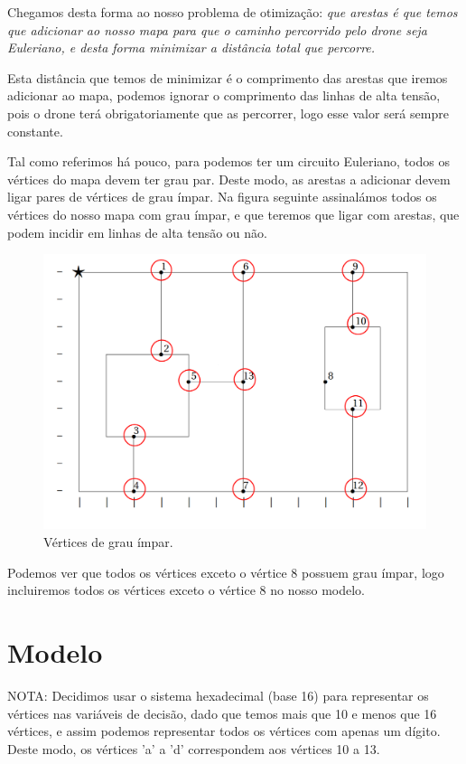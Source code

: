 \documentclass{article}
\begin{document}
Chegamos desta forma ao nosso problema de otimização: \emph{que arestas é que temos que adicionar ao nosso mapa para que o caminho percorrido pelo drone seja Euleriano, e desta forma minimizar a distância total que percorre.}

Esta distância que temos de minimizar é o comprimento das arestas que iremos adicionar ao mapa, podemos ignorar o comprimento das linhas de alta tensão, pois o drone terá obrigatoriamente que as percorrer, logo esse valor será sempre constante.

Tal como referimos há pouco, para podemos ter um circuito Euleriano, todos os vértices do mapa devem ter grau par. Deste modo, as arestas a adicionar devem ligar pares de vértices de grau ímpar. Na figura seguinte assinalámos todos os vértices do nosso mapa com grau ímpar, e que teremos que ligar com arestas, que podem incidir em linhas de alta tensão ou não.

\begin{figure}[h]
    \centering
    \includegraphics[width=0.8\linewidth]{fig2.png}
    \caption{Vértices de grau ímpar.}
    \label{fig:verticesimpares}
\end{figure}

Podemos ver que todos os vértices exceto o vértice 8 possuem grau ímpar, logo incluiremos todos os vértices exceto o vértice 8 no nosso modelo.

\section{Modelo}

NOTA: Decidimos usar o sistema hexadecimal (base 16) para representar os vértices nas variáveis de decisão, dado que temos mais que 10 e menos que 16 vértices, e assim podemos representar todos os vértices com apenas um dígito. Deste modo, os vértices 'a' a 'd' correspondem aos vértices 10 a 13.
\end{document}
